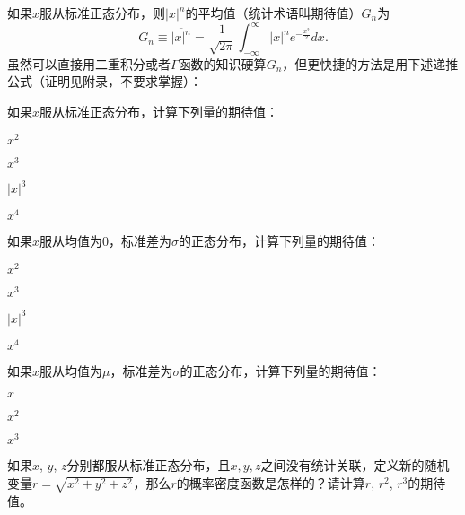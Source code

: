 \documentclass[CJK]{beamer}
\begin{document}
\begin{frame}
\bch
如果$x$服从标准正态分布，则$|x|^n$的平均值（统计术语叫期待值）$G_n$为
$$G_n \equiv \overline{|x|^n} =  \frac{1}{\sqrt{2\pi}} \int_{-\infty}^{\infty} |x|^n e^{-\frac{x^2}{2}} dx.$$
虽然可以直接用二重积分或者$\Gamma$函数的知识硬算$G_n$，但更快捷的方法是用下述递推公式（证明见附录，不要求掌握）：
\ech
\end{frame}


\begin{frame}
\bch
{}

如果$x$服从标准正态分布，计算下列量的期待值：

\bitem
\item{$x^2$}
\item{$x^3$}
\item{$|x|^3$}
\item{$x^4$}  
\eitem
\ech
\end{frame}



\begin{frame}
\bch
{}

如果$x$服从均值为$0$，标准差为$\sigma$的正态分布，计算下列量的期待值：

\bitem
\item{$x^2$}
\item{$x^3$}
\item{$|x|^3$}
\item{$x^4$}  
\eitem
\ech
\end{frame}


\begin{frame}
\bch
{}

如果$x$服从均值为$\mu$，标准差为$\sigma$的正态分布，计算下列量的期待值：

\bitem
\item{$x$}
\item{$x^2$}
\item{$x^3$}
\eitem
\ech
\end{frame}


\begin{frame}
\bch
{}

如果$x$, $y$, $z$分别都服从标准正态分布，且$x,y,z$之间没有统计关联，定义新的随机变量$r=\sqrt{x^2+y^2+z^2}$，那么$r$的概率密度函数是怎样的？请计算$r$, $r^2$, $r^3$的期待值。

\ech
\end{frame}
\end{document}
